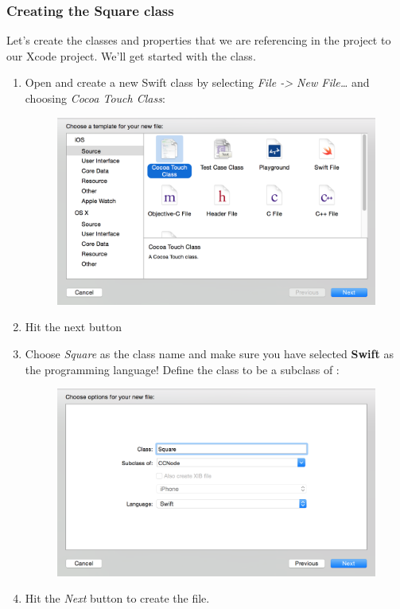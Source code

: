 \subsubsection{Creating the Square class}
Let's create the classes and properties that we are referencing
in the \SB{} project to our Xcode project. We'll get started with the
 class.
\begin{leftbar}
\begin{enumerate}
  \item Open \xcode{} and create a new Swift class by selecting \textit{File ->
New File\ldots} and choosing \textit{Cocoa Touch Class}: 
\begin{figure}[H]
    \centering
    \includegraphics[width=350pt]{images/Chapter1/new_cocoa_touch.png}
\end{figure}
  \item Hit the next button
  \item Choose \textit{Square} as the class name and make sure you have selected
  \textbf{Swift} as the programming language! Define the class to be a subclass
  of \ccnode{}: \begin{figure}[H]
    \centering
    \includegraphics[width=350pt]{images/Chapter1/new_cocoa_touch_2.png}
\end{figure}
\item Hit the \textit{Next} button to create the file.
\end{enumerate}
\end{leftbar}

